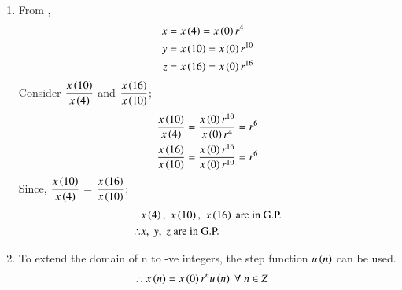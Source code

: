 \documentclass[journal,12pt,twocolumn]{IEEEtran}
\theoremstyle{remark}
\begin{document}
\begin{enumerate}
\item From ,
\begin{align}
    x&= x\left(4\right) =x\left(0\right)r^4 \\
 y&=x\left(10\right)=x\left(0\right)r^{10} \\
 z&=x\left(16\right)=x\left(0\right)r^{16}
\end{align}
Consider $\dfrac{x\left(10\right)}{x\left(4\right)}$ and $\dfrac{x\left(16\right)}{x\left(10\right)}$;
\begin{align}
 \dfrac{x\left(10\right)}{x\left(4\right)} &= \dfrac{x\left(0\right)r^{10}}{x\left(0\right)r^4} = r^6\\ 
 \dfrac{x\left(16\right)}{x\left(10\right)} &= \dfrac{x\left(0\right)r^{16}}{x\left(0\right)r^{10}} = r^6
\end{align}
Since, $\dfrac{x\left(10\right)}{x\left(4\right)}$ = $\dfrac{x\left(16\right)}{x\left(10\right)}$;\\
\begin{align}  
   & x\left(4\right),\; x\left(10\right),\; x\left(16\right)\text{ are in G.P.} \\
  \therefore & x,\; y,\; z \text{ are in G.P.}
\end{align}

\item
To extend the domain of n to -ve integers, the step function $u\left(n\right)$ can be used.
\begin{align}
\therefore x\left(n\right) &= x\left(0\right)r^n u\left(n\right) \; \forall \;n\in Z
\end{align}


\end{enumerate}
\end{document}
